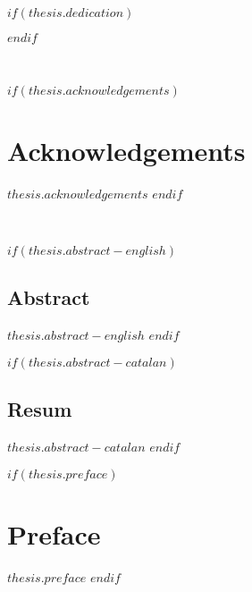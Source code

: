 \begin{spacing}{1.5}


$if(thesis.dedication)$
\clearpage
 \begin{flushleft}%
  \thispagestyle{empty}
  \normalsize\itshape{}
\end{flushleft}
\clearpage
$endif$


\clearpage
~
\thispagestyle{empty}
\clearpage


$if(thesis.acknowledgements)$
\clearpage
\chapter*{\sffamily Acknowledgements}
\vspace*{\baselineskip}
\normalsize{$thesis.acknowledgements$}
\clearpage
$endif$

\clearpage
~
\thispagestyle{empty}
\clearpage


$if(thesis.abstract-english)$
\clearpage
\section*{\sffamily Abstract}
\normalsize{$thesis.abstract-english$}
\vspace*{\baselineskip}
\clearpage
$endif$


$if(thesis.abstract-catalan)$
\clearpage
\section*{\sffamily Resum}
\normalsize{$thesis.abstract-catalan$}
\afterpage{\blankpage}
\clearpage
$endif$



$if(thesis.preface)$
\clearpage
\chapter*{\sffamily Preface}
\vspace*{\baselineskip}
\normalsize{$thesis.preface$}
\clearpage
$endif$

\end{spacing}
